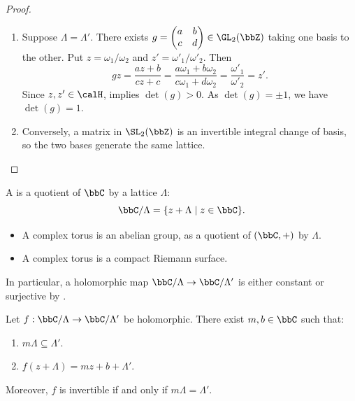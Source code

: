 \begin{proof}
    \leavevmode
    \begin{enumerate}[label=(\arabic*)]
        \item Suppose $\Lambda = \Lambda'$. There exists $g = \begin{pmatrix}a & b\\ c & d\end{pmatrix} \in \GL_2(\bbZ)$ taking one basis to the other. Put $z = \omega_1/\omega_2$ and $z' = \omega'_1/\omega'_2$. Then
        \[
            gz = \frac{az + b}{cz + c} = \frac{a\omega_1 + b\omega_2}{c\omega_1 + d\omega_2} = \frac{\omega'_1}{\omega'_2} = z'.
        \]
        Since $z, z' \in \calH$,  implies $\det(g) > 0$. As $\det(g) = \pm 1$, we have $\det(g) = 1$.
        \item Conversely, a matrix in $\SL_2(\bbZ)$ is an invertible integral change of basis, so the two bases generate the same lattice.
    \end{enumerate}
\end{proof}

\begin{definition}\label{Def:MF_complex_torus}
    A  is a quotient of $\bbC$ by a lattice $\Lambda$:
    \[
        \bbC/\Lambda = \{z + \Lambda \mid z \in \bbC\}.
    \]
\end{definition}

\begin{remark}
    \leavevmode
    \begin{itemize}
        \item A complex torus is an abelian group, as a quotient of $(\bbC, +)$ by $\Lambda$.
        \item A complex torus is a compact Riemann surface.
    \end{itemize}
    In particular, a holomorphic map $\bbC/\Lambda \to \bbC/\Lambda'$ is either constant or surjective by .
\end{remark}

\begin{proposition}\label{Prop:MF_torus_maps}
    Let $f : \bbC/\Lambda \to \bbC/\Lambda'$ be holomorphic. There exist $m, b \in \bbC$ such that:
    \begin{enumerate}[label=(\arabic*)]
        \item $m\Lambda \subseteq \Lambda'$.
        \item $f(z + \Lambda) = mz + b + \Lambda'$.
    \end{enumerate}
    Moreover, $f$ is invertible if and only if $m\Lambda = \Lambda'$.
\end{proposition}

